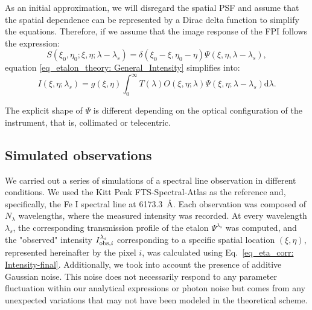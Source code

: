 As an initial approximation, we will disregard the spatial PSF and assume that the spatial dependence can be represented by a Dirac delta function to simplify the equations. Therefore, if we assume that the image response of the FPI follows the expression:
\begin{equation}
S\left(\xi_0, \eta_0; \xi , \eta; \lambda-\lambda_{s}\right)=\delta(\xi_0-\xi,\eta_0-\eta)\Psi(\xi,\eta,\lambda-\lambda_s),
\end{equation}
equation \eqref{eq_etalon_theory: General_Intensity} simplifies into:
\begin{equation}
    I\left(\xi, \eta ; \lambda_{s}\right)=g(\xi, \eta)\int_{0}^{\infty} T(\lambda)  O\left(\xi, \eta ; \lambda\right) \Psi\left(\xi, \eta ; \lambda-\lambda_{s}\right)  \mathrm{d} \lambda.
    \label{eq_eta_corr: intensity}
\end{equation}



The explicit shape of $\Psi$ is different depending on the optical configuration of the instrument, that is, collimated or telecentric.

\subsection{\label{eta_corr_susec: simulating obs} Simulated observations}
  
  
We carried out a series of simulations of a spectral line observation in different conditions. We used the Kitt Peak FTS-Spectral-Atlas as the reference \citep{fts} and, specifically, the Fe I spectral line at 6173.3~\r{A}. Each observation was composed of $N_\lambda$ wavelengths, where the measured intensity was recorded. At every wavelength $\lambda_s$, the corresponding transmission profile of the etalon $\Psi^{\lambda_s}$ was computed, and the "observed" intensity $I ^{\lambda _ s} _ {{\rm obs}, i}$ corresponding to a specific spatial location $(\xi, \eta)$, represented hereinafter by the pixel $i$, was calculated using Eq.~\eqref{eq_eta_corr: Intensity-final}. Additionally, we took into account the presence of additive Gaussian noise. This noise does not necessarily respond to any parameter fluctuation within our analytical expressions or photon noise but comes from any unexpected variations that may not have been modeled in the theoretical scheme.

